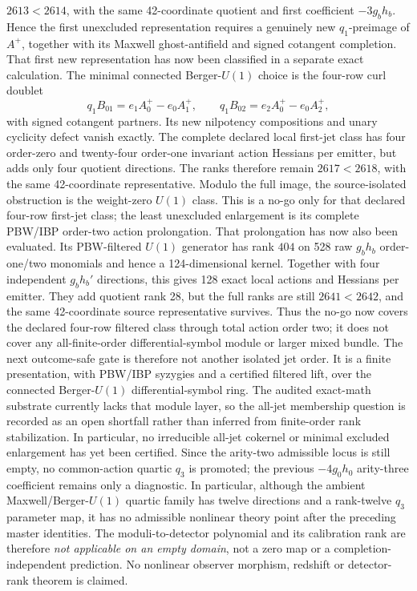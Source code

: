 \documentclass[11pt]{article}
\theoremstyle{definition}
\theoremstyle{remark}
\begin{document}
\begin{enumerate}
\(2613<2614\), with the same 42-coordinate quotient and first coefficient
\(-3g_bh_b\).  Hence the first unexcluded representation requires a genuinely
new \(q_1\)-preimage of \(A^+\), together with its Maxwell ghost-antifield and
signed cotangent completion.  That first new representation has now been
classified in a separate exact calculation.  The minimal connected
Berger-\(U(1)\) choice is the four-row curl doublet
\[
 q_1B_{01}=e_1A^+_0-e_0A^+_1,\qquad
 q_1B_{02}=e_2A^+_0-e_0A^+_2,
\]
with signed cotangent partners.  Its new nilpotency compositions and unary
cyclicity defect vanish exactly.  The complete declared local first-jet
class has four order-zero and twenty-four order-one invariant action
Hessians per emitter, but adds only four quotient directions.  The ranks
therefore remain \(2617<2618\), with the same 42-coordinate representative.
Modulo the full image, the source-isolated obstruction is the weight-zero
\(U(1)\) class.  This is a no-go only for that declared four-row first-jet
class; the least unexcluded enlargement is its complete PBW/IBP order-two
action prolongation.  That prolongation has now also been evaluated.  Its
PBW-filtered \(U(1)\) generator has rank \(404\) on 528 raw
\(g_bh_b\) order-one/two monomials and hence a 124-dimensional kernel.
Together with four independent \(g_bh_b'\) directions, this gives 128 exact
local actions and Hessians per emitter.  They add quotient rank 28, but the
full ranks are still \(2641<2642\), and the same 42-coordinate source
representative survives.  Thus the no-go now covers the declared four-row
filtered class through total action order two; it does not cover any
all-finite-order differential-symbol module or larger mixed bundle.  The
next outcome-safe gate is therefore not another isolated jet order.  It is a
finite presentation, with PBW/IBP syzygies and a certified filtered lift,
over the connected Berger-\(U(1)\) differential-symbol ring.  The audited
exact-math substrate currently lacks that module layer, so the all-jet
membership question is recorded as an open shortfall rather than inferred
from finite-order rank stabilization.  In particular, no irreducible
all-jet cokernel or minimal excluded enlargement has yet been certified.
Since the arity-two
admissible locus is still empty,
no common-action quartic \(q_3\) is promoted; the previous \(-4g_0h_0\)
arity-three coefficient remains only a diagnostic.  In particular, although
the ambient Maxwell/Berger-\(U(1)\)
quartic family has twelve directions and a rank-twelve \(q_3\) parameter
map, it has no admissible nonlinear theory point after the preceding master
identities.  The moduli-to-detector polynomial and its calibration rank are
therefore \emph{not applicable on an empty domain}, not a zero map or a
completion-independent prediction.  No nonlinear observer morphism,
redshift or detector-rank theorem is claimed.
\end{enumerate}
\end{document}

